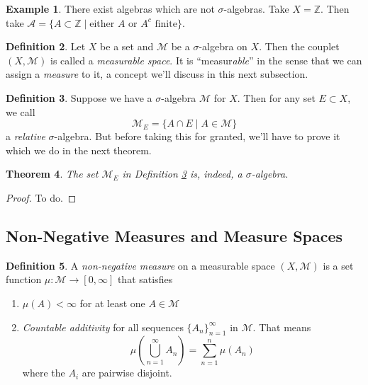 \documentclass[12pt]{article}
\theoremstyle{plain}
\newtheorem{thm}{Theorem}[subsection]
\theoremstyle{definition}
\newtheorem{defn}[thm]{Definition}
\newtheorem{ex}[thm]{Example}
\theoremstyle{remark}
\begin{document}
\begin{ex}
There exist algebras which are not $\sigma$-algebras. Take $X=\mathbb{Z}$. Then take $\mathscr{A} = \{A\subset \mathbb{Z} \; |\; \text{either $A$ or $A^c$ finite}\}$. 
\end{ex}

\begin{defn} 
Let $X$ be a set and $\mathscr{M}$ be a $\sigma$-algebra on $X$. Then the couplet $(X, \mathscr{M})$ is called a \emph{measurable space}. It is ``measur\emph{able}'' in the sense that we can assign a \emph{measure} to it, a concept we'll discuss in this next subsection.
\end{defn}

\begin{defn}
\label{relsigal}
Suppose we have a $\sigma$-algebra $\mathscr{M}$ for $X$. Then for any set $E\subset X$, we call
\[
    \mathscr{M}_E = \{ A \cap E \; | \; A \in \mathscr{M}\}
\]
a \emph{relative} $\sigma$-algebra. But before taking this for granted, we'll have to prove it which we do in the next theorem.
\end{defn}

\begin{thm}
\label{relsigal.thm}
The set $\mathscr{M}_E$ in Definition \ref{relsigal} is, indeed, a $\sigma$-algebra.
\end{thm}
\begin{proof}
To do.
\end{proof}





\subsection{Non-Negative Measures and Measure Spaces}

\begin{defn} 
A \emph{non-negative measure} on a measurable space $(X,\mathscr{M})$ is a set function $\mu: \mathscr{M} \rightarrow [0,\infty]$ that satisfies 
\begin{enumerate}
    \item $\mu(A)<\infty$ for at least one $A\in\mathscr{M}$ 
    \item \emph{Countable additivity} for all sequences $\{A_n\}_{n=1}^\infty$ in $\mathscr{M}$. That means 
        \[
            \mu\left(\bigcup^\infty_{n=1}A_n\right) 
            = \sum^n_{n=1} \mu(A_n)
        \]
        where the $A_i$ are pairwise disjoint.
\end{enumerate}
\end{defn}
\end{document}
